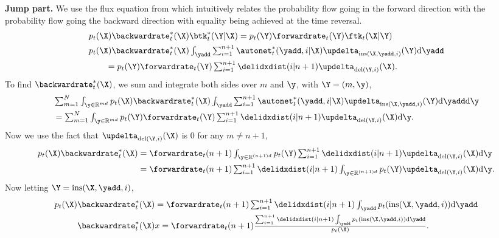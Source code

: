 \textbf{Jump part.}
We use the flux equation from \cite{conforti2022time} which intuitively relates the probability flow going in the forward direction with the probability flow going the backward direction with equality being achieved at the time reversal.
\begin{align}
  &p_t(\X) \backwardrate_t^*(\X) \btk_t^*(\Y | \X) = p_t(\Y) \forwardrate_t(\Y) \ftk_t(\X | \Y)\\
  &\textstyle p_t(\X) \backwardrate_t^*(\X) \int_{\yadd} \sum_{i=1}^{n+1} \autonet_t^*(\yadd, i | \X) \updelta_{\text{ins}(\X, \yadd, i)}(\Y) \rmd \yadd \\
  & \qquad = \textstyle p_t(\Y) \forwardrate_t(\Y) \sum_{i=1}^{n+1} \delidxdist(i | n+1) \updelta_{\text{del}(\Y, i)}(\X) . \label{eq:probflowfull}
\end{align}
To find $\backwardrate_t^*(\X)$, we sum and integrate both sides over $m$ and $\y$, with $\Y = (m, \y)$,
\begin{align}
    &\textstyle \sum_{m=1}^N \int_{\y \in \mathbb{R}^{md}} p_t(\X) \backwardrate_t^*(\X) \int_{\yadd} \sum_{i=1}^{n+1} \autonet_t^*(\yadd, i | \X) \updelta_{\text{ins}(\X, \yadd, i)}(\Y) \rmd \yadd \rmd \y \\
    &\textstyle = \sum_{m=1}^N \int_{\y \in \mathbb{R}^{md}} p_t(\Y) \forwardrate_t(\Y) \sum_{i=1}^{n+1} \delidxdist(i | n+1) \updelta_{\text{del}(\Y, i)}(\X) \rmd \y.
\end{align}
Now we use the fact that $\updelta_{\text{del}(\Y, i)}(\X)$ is $0$ for any $m \neq n+1$,
\begin{align}
    p_t(\X) \backwardrate_t^*(\X) &\textstyle = \forwardrate_t(n+1) \int_{\y \in \mathbb{R}^{(n+1)d}} p_t(\Y) \sum_{i=1}^{n+1} \delidxdist(i | n+1) \updelta_{\text{del}(\Y, i)} (\X) \rmd \y\\
    &\textstyle = \forwardrate_t(n+1) \sum_{i=1}^{n+1} \delidxdist(i | n+1) \int_{\y \in \mathbb{R}^{(n+1)d}} p_t(\Y)  \updelta_{\text{del}(\Y, i)} (\X) \rmd \y.
\end{align}
Now letting $\Y = \text{ins}(\X, \yadd, i)$,
\begin{align}
    p_t(\X) \backwardrate_t^*(\X) &\textstyle = \forwardrate_t(n+1) \sum_{i=1}^{n+1} \delidxdist(i | n+1) \int_{\yadd} p_t(\text{ins}(\X, \yadd, i)) \rmd \yadd\\
    \backwardrate_t^*(\X) &\textstyle x= \forwardrate_t(n+1) \frac{\sum_{i=1}^{n+1} \delidxdist(i | n+1) \int_{\yadd} p_t(\text{ins}(\X, \yadd, i)) \rmd \yadd}{p_t(\X)}.
\end{align}
\newcommand{\zadd}{\mathbf{z}^{\text{add}}}

